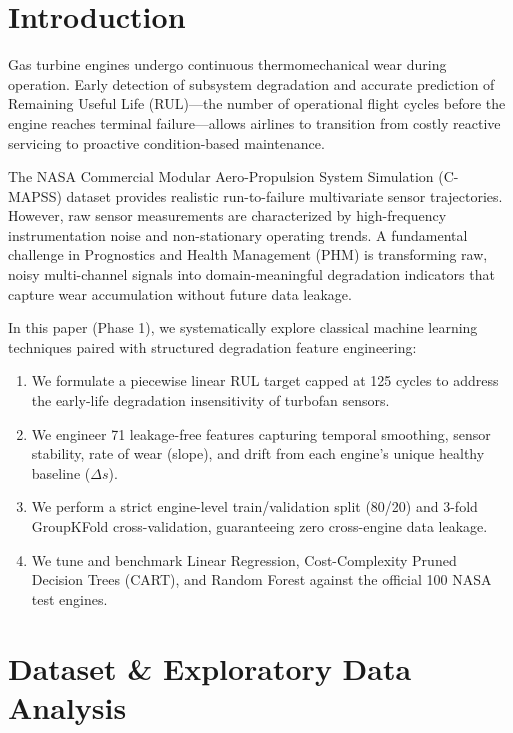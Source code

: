 \documentclass[conference]{IEEEtran}
\begin{document}
\section{Introduction}
Gas turbine engines undergo continuous thermomechanical wear during operation. Early detection of subsystem degradation and accurate prediction of Remaining Useful Life (RUL)---the number of operational flight cycles before the engine reaches terminal failure---allows airlines to transition from costly reactive servicing to proactive condition-based maintenance.

The NASA Commercial Modular Aero-Propulsion System Simulation (C-MAPSS) dataset provides realistic run-to-failure multivariate sensor trajectories. However, raw sensor measurements are characterized by high-frequency instrumentation noise and non-stationary operating trends. A fundamental challenge in Prognostics and Health Management (PHM) is transforming raw, noisy multi-channel signals into domain-meaningful degradation indicators that capture wear accumulation without future data leakage.

In this paper (Phase 1), we systematically explore classical machine learning techniques paired with structured degradation feature engineering:
\begin{enumerate}
    \item We formulate a piecewise linear RUL target capped at 125 cycles to address the early-life degradation insensitivity of turbofan sensors.
    \item We engineer 71 leakage-free features capturing temporal smoothing, sensor stability, rate of wear (slope), and drift from each engine's unique healthy baseline ($\Delta s$).
    \item We perform a strict engine-level train/validation split (80/20) and 3-fold GroupKFold cross-validation, guaranteeing zero cross-engine data leakage.
    \item We tune and benchmark Linear Regression, Cost-Complexity Pruned Decision Trees (CART), and Random Forest against the official 100 NASA test engines.
\end{enumerate}

\section{Dataset \& Exploratory Data Analysis}
\end{document}
